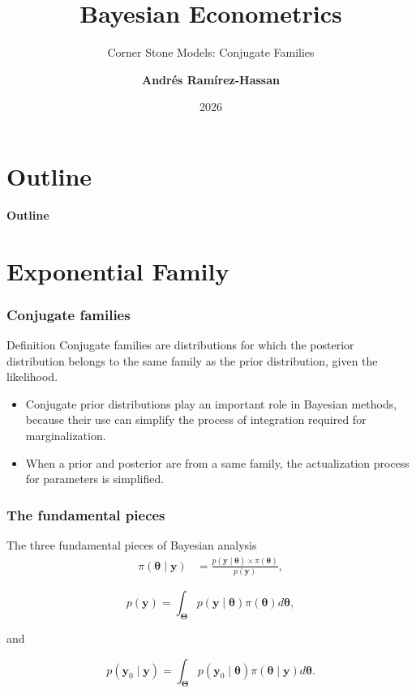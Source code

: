 \documentclass[12pt, compress]{beamer}
\title{Bayesian Econometrics}
\subtitle{Corner Stone Models: Conjugate Families}
\date{2026} %
\author[Andr\'e Ram\'irez H.]{\textbf{Andr\'es Ram\'irez-Hassan}}
\institute[EAFIT]{\small{Universidad EAFIT\\School of Finance, Economics and Government}}
\begin{document}
	\maketitle
	
	
	
	
	\section*{Outline}
	\begin{frame}
		\textbf{\Large{Outline}}
		\tableofcontents
	\end{frame}

\section{Exponential Family}
\begin{frame}
	\frametitle{Conjugate families}
	\begin{block}{Definition}
			Conjugate families are distributions for which the posterior distribution belongs to the same family as the prior distribution, given the likelihood.
	\end{block}

	\begin{itemize}
		\item Conjugate prior distributions play an important role in Bayesian methods, because their use can simplify the process of integration required for marginalization.
		\item When a prior and posterior are from a same family, the actualization process for parameters is simplified.
	\end{itemize}
\end{frame}



\begin{frame}
	\frametitle{The fundamental pieces}
	The three fundamental pieces of Bayesian analysis
\begin{align}
	\pi(\bm{\theta}\mid \bm{y})&=\frac{p(\bm{y}\mid \bm{\theta}) \times \pi(\bm{\theta})}{p(\bm{y})},
	\label{eq:411}
\end{align}

\begin{equation}
	p(\bm{y})=\int_{\bm{\Theta}}p(\bm{y}\mid \bm{\theta})\pi(\bm{\theta})d\bm{\theta},
	\label{eq:412}
\end{equation}

and 

\begin{equation}
	p(\bm{y}_0\mid \bm{y})=\int_{\bm{\Theta}}p(\bm{y}_0\mid \bm{\theta})\pi(\bm{\theta}\mid \bm{y})d\bm{\theta}.
	\label{eq:413}
\end{equation}
\end{frame}
\end{document}
